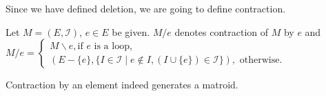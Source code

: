 % 
% 

Since we have defined deletion, we are going to define contraction.
\begin{defn}
Let $M = (E, \mathcal{I})$, $e \in E$ be given.
$M / e$ denotes contraction of $M$ by $e$ and 
$M / e = \begin{cases}
      M \backslash e, \text{if $e$ is a loop},\\
      (E - \{ e \}, \{ I \in \mathcal{I} \mid e \notin I, (I \cup \{ e \}) \in \mathcal{I}\}), \text{ otherwise}.
         \end{cases}$
\end{defn}


\begin{thm}
Contraction by an element indeed generates a matroid.
\end{thm}

